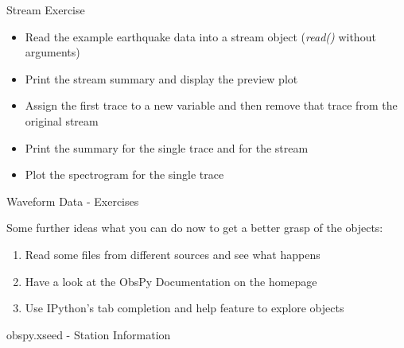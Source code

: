 \documentclass[handout]{beamer}
\begin{document}
\begin{frame}{Stream Exercise}
    \begin{itemize}
        \item Read the example earthquake data into a stream object (\textit{read()} without arguments)
        \item Print the stream summary and display the preview plot
        \item Assign the first trace to a new variable and then remove that trace from the original stream
        \item Print the summary for the single trace and for the stream
        \item Plot the spectrogram for the single trace
    \end{itemize}
\end{frame}


\begin{frame}{Waveform Data - Exercises}

    Some further ideas what you can do now to get a better grasp of the objects:

    \begin{enumerate}
        \item Read some files from different sources and see what happens
        \item Have a look at the ObsPy Documentation on the homepage
        \item Use IPython's tab completion and help feature to explore objects
    \end{enumerate}


\end{frame}

\begin{frame}{}
    \begin{center}
        \textcolor{lmu@darkgreen}{\LARGE{obspy.xseed - Station Information}}
    \end{center}
\end{frame}
\end{document}
